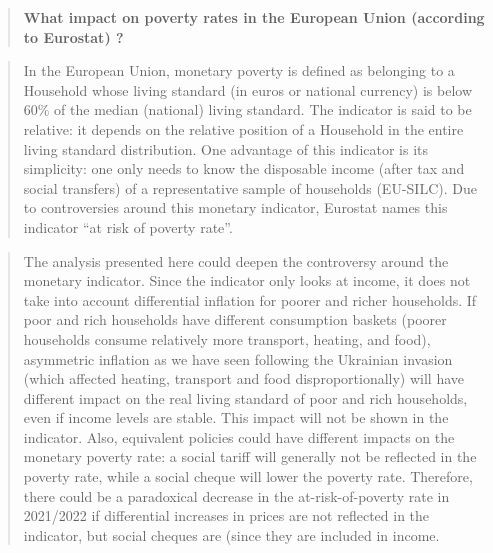 \documentclass[
  9pt,
  a4paper,
  DIV=11,
  numbers=noendperiod]{scrartcl}
\begin{document}
\begin{quote}
\textbf{What impact on poverty rates in the European Union (according to
Eurostat) ?}
\end{quote}

\begin{quote}
In the European Union, monetary poverty is defined as belonging to a
Household whose living standard (in euros or national currency) is below
60\% of the median (national) living standard. The indicator is said to
be relative: it depends on the relative position of a Household in the
entire living standard distribution. One advantage of this indicator is
its simplicity: one only needs to know the disposable income (after tax
and social transfers) of a representative sample of households
(EU-SILC). Due to controversies around this monetary indicator, Eurostat
names this indicator ``at risk of poverty rate''.
\end{quote}

\begin{quote}
The analysis presented here could deepen the controversy around the
monetary indicator. Since the indicator only looks at income, it does
not take into account differential inflation for poorer and richer
households. If poor and rich households have different consumption
baskets (poorer households consume relatively more transport, heating,
and food), asymmetric inflation as we have seen following the Ukrainian
invasion (which affected heating, transport and food disproportionally)
will have different impact on the real living standard of poor and rich
households, even if income levels are stable. This impact will not be
shown in the indicator. Also, equivalent policies could have different
impacts on the monetary poverty rate: a social tariff will generally not
be reflected in the poverty rate, while a social cheque will lower the
poverty rate. Therefore, there could be a paradoxical decrease in the
at-risk-of-poverty rate in 2021/2022 if differential increases in prices
are not reflected in the indicator, but social cheques are (since they
are included in income.
\end{quote}
\end{document}
